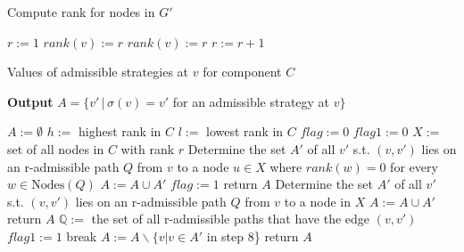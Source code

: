 \begin{algorithm}
	\caption{Compute rank for nodes in $G'$}
	\label{alg:algorithm6}
	\begin{algorithmic}[1]
		\STATE $r := 1$
		\STATE $rank(v) := r$
		\ENDFOR
		\ELSE
		\STATE $rank(v) := r$
		\ENDFOR
		\ENDIF
		\STATE $r := r + 1$
		\ENDWHILE
		\ENDFOR
	\end{algorithmic}
\end{algorithm}

\begin{algorithm}
	\caption{Values of admissible strategies at $v$ for component $C$}
	\textbf{Output} $ A = \{v' \, | \, \sigma(v) = v'$ for an admissible strategy at $v\}$  
	\label{alg:algorithm7}
	\begin{algorithmic}[1]
		\STATE $A := \emptyset$
		\STATE $h := $ highest rank in $C$
		\STATE $l := $ lowest rank in $C$            
		\STATE $flag := 0$
		\STATE $flag1 := 0$
		\STATE $X := $ set of all nodes in $C$ with rank $r$
		\STATE Determine the set $A'$ of all $v'$ s.t. $(v,v')$ lies on an r-admissible path $Q$ from $v$ to a node $u \in X$ where $rank(w) = 0$ for every $w \in \mathrm{Nodes}(Q)$ 
		\STATE $A := A \cup A'$ 
		\STATE $flag := 1$
		\ENDIF
		\STATE return $A$   
		\ENDIF
		\STATE Determine the set $A'$ of all $v'$ s.t. $(v,v')$ lies on an r-admissible path $Q$ from $v$ to a node in $X$      
		\STATE $A := A \cup A'$ 
		\ELSE
		\STATE return $A$ 
		\ELSE 
		\STATE $\mathbb{Q} := $ the set of all r-admissible paths that have the edge $(v,v')$
		\STATE $flag1 := 1$
		\STATE break
		\ENDIF
		\ENDFOR
		\STATE $A := A \backslash \{ v | v \in A'$ in step 8\} 
		\STATE return $A$
		\ENDIF
		\ENDFOR
  \end{algorithmic}
\end{algorithm}

